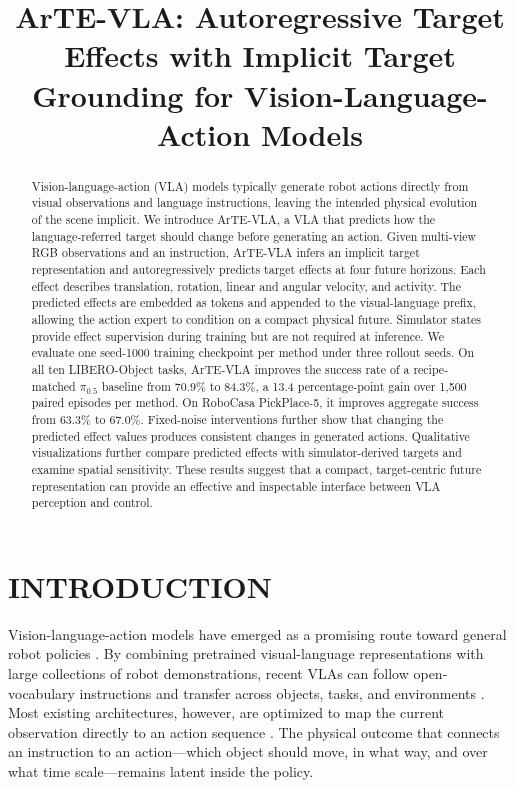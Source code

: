 \documentclass[letterpaper,10pt,conference]{ieeeconf}
\title{\LARGE \bf ArTE-VLA: Autoregressive Target Effects with Implicit Target Grounding for Vision-Language-Action Models}
\newcommand{\method}{ArTE-VLA}
\newcommand{\pihalf}{\ensuremath{\pi_{0.5}}}
\begin{document}
\maketitle
\thispagestyle{empty}
\pagestyle{empty}

\begin{abstract}
Vision-language-action (VLA) models typically generate robot actions directly from visual observations and language instructions, leaving the intended physical evolution of the scene implicit.
We introduce \method{}, a VLA that predicts how the language-referred target should change before generating an action.
Given multi-view RGB observations and an instruction, \method{} infers an implicit target representation and autoregressively predicts target effects at four future horizons.
Each effect describes translation, rotation, linear and angular velocity, and activity.
The predicted effects are embedded as tokens and appended to the visual-language prefix, allowing the action expert to condition on a compact physical future.
Simulator states provide effect supervision during training but are not required at inference.
We evaluate one seed-1000 training checkpoint per method under three rollout seeds.
On all ten LIBERO-Object tasks, \method{} improves the success rate of a recipe-matched \pihalf{} baseline from 70.9\% to 84.3\%, a 13.4 percentage-point gain over 1,500 paired episodes per method.
On RoboCasa PickPlace-5, it improves aggregate success from 63.3\% to 67.0\%.
Fixed-noise interventions further show that changing the predicted effect values produces consistent changes in generated actions.
Qualitative visualizations further compare predicted effects with simulator-derived targets and examine spatial sensitivity.
These results suggest that a compact, target-centric future representation can provide an effective and inspectable interface between VLA perception and control.
\end{abstract}



\section{INTRODUCTION}
\label{sec:introduction}

Vision-language-action models have emerged as a promising route toward general robot policies \cite{kawaharazuka2025vision,li2024towards,ma2026survey,shao2025large}.
By combining pretrained visual-language representations with large collections of robot demonstrations, recent VLAs can follow open-vocabulary instructions and transfer across objects, tasks, and environments \cite{pi05,din2025vision,kawaharazuka2025vision}.
Most existing architectures, however, are optimized to map the current observation directly to an action sequence \cite{sapkota2025vision, zhong2025survey}.
The physical outcome that connects an instruction to an action---which object should move, in what way, and over what time scale---remains latent inside the policy.
\end{document}
